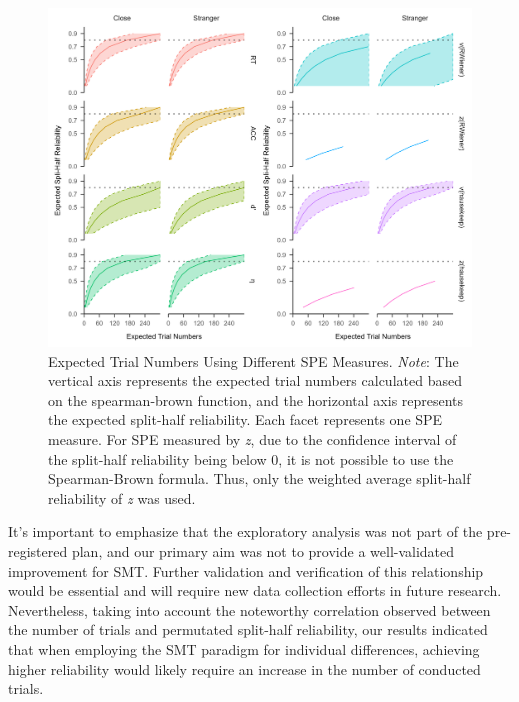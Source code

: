 \documentclass[sn-apa]{sn-jnl}%
\theoremstyle{thmstyleone}%
\theoremstyle{thmstyletwo}%
\theoremstyle{thmstylethree}%
\begin{document}
\begin{figure}[!ht]
	\centering
	\includegraphics[width=1\textwidth]{./Figure/Figure10_Spear_Brown.png} 
	\caption[Expected Trial Numbers Using Different SPE Measures.]{Expected Trial Numbers Using Different SPE Measures. \textit{Note}: The vertical axis represents the expected trial numbers calculated based on the spearman-brown function, and the horizontal axis represents the expected split-half reliability. Each facet represents one SPE measure. For SPE measured by \textit{z}, due to the confidence interval of the split-half reliability being below 0, it is not possible to use the Spearman-Brown formula. Thus, only the weighted average split-half reliability of \textit{z} was used.
	}\label{fig:SP}
\end{figure}

It’s important to emphasize that the exploratory analysis was not part of the pre-registered plan, and our primary aim was not to provide a well-validated improvement for SMT. Further validation and verification of this relationship would be essential and will require new data collection efforts in future research. Nevertheless, taking into account the noteworthy correlation observed between the number of trials and permutated split-half reliability, our results indicated that when employing the SMT paradigm for individual differences, achieving higher reliability would likely require an increase in the number of conducted trials. 

\clearpage
\printbibliography
\end{document}

